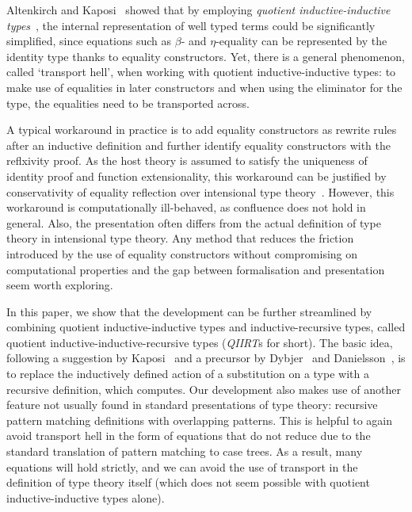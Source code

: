 \documentclass[a4paper,UKenglish,numberwithinsect,cleveref,thm-restate]{lipics-v2021}
\begin{document}
Altenkirch and Kaposi~\cite{Altenkirch2016a} showed that by employing \emph{quotient inductive-inductive types}~\cite{Altenkirch2018}, the internal representation of well typed terms could be significantly simplified, since equations such as $\beta$- and $\eta$-equality can be represented by the identity type thanks to equality constructors.
%
Yet, there is a general phenomenon, called `transport hell', when working with quotient inductive-inductive types: to make use of equalities in later constructors and when using the eliminator for the type, the equalities need to be transported across.
%

A typical workaround in practice \cite{Kaposi2019,Kaposi2024a} is to add equality constructors as rewrite rules after an inductive definition and further identify equality constructors with the reflxivity proof.
%
As the host theory is assumed to satisfy the uniqueness of identity proof and function extensionality, this workaround can be justified by conservativity of equality reflection over intensional type theory~\cite{Hofmann1996,Winterhalter2019,Kapulkin2025}.
%
However, this workaround is computationally ill-behaved, as confluence does not hold in general.
Also, the presentation often differs from the actual definition of type theory in intensional type theory.
%
Any method that reduces the friction introduced by the use of equality constructors without compromising on computational properties and the gap between formalisation and presentation seem worth exploring.
%

In this paper, we show that the development can be further streamlined by combining quotient inductive-inductive types and inductive-recursive types, called quotient inductive-inductive-recursive types (\emph{QIIRT}s for short).
%
The basic idea, following a suggestion by Kaposi~\cite{Kaposi2023} and a precursor by Dybjer~\cite{Dybjer1996} and Danielsson~\cite{Danielsson2006}, is to replace the inductively defined action of a substitution on a type with a recursive definition, which computes.
%
Our development also makes use of another feature not usually found in standard presentations of type theory: recursive pattern matching definitions with overlapping patterns.
%
This is helpful to again avoid transport hell in the form of equations that do not reduce due to the standard translation of pattern matching to case trees.
%
As a result, many equations will hold strictly, and we can avoid the use of transport in the definition of type theory itself (which does not seem possible with quotient inductive-inductive types alone).
%
\end{document}

